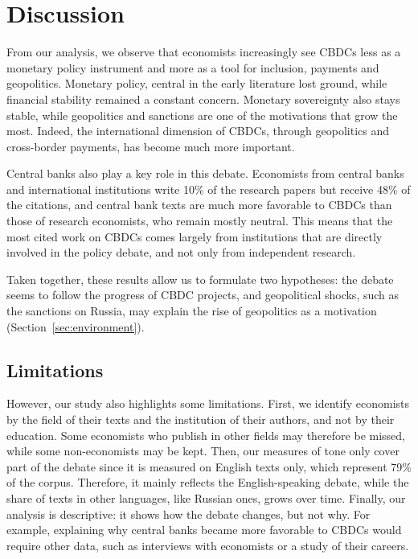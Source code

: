\documentclass[11pt,a4paper]{article}
\begin{document}
\section{Discussion}\label{sec:discussion}

From our analysis, we observe that economists increasingly see CBDCs less as a monetary policy instrument and 
more as a tool for inclusion, payments and geopolitics. Monetary policy, central in the early literature lost 
ground, while financial stability remained a constant concern. Monetary sovereignty also stays stable, while 
geopolitics and sanctions are one of the motivations that grow the most. Indeed, the international dimension of 
CBDCs, through geopolitics and cross-border payments, has become much more important.

Central banks also play a key role in this debate. Economists from central banks and international institutions 
write 10\% of the research papers but receive 48\% of the citations, and central bank texts are much more 
favorable to CBDCs than those of research economists, who remain mostly neutral. This means that the most cited 
work on CBDCs comes largely from institutions that are directly involved in the policy debate, and not only from 
independent research.

Taken together, these results allow us to formulate two hypotheses: the debate seems to follow the progress of CBDC projects, 
and geopolitical shocks, such as the sanctions on Russia, may explain the rise of geopolitics as a motivation (Section~\ref{sec:environment}).


\subsection{Limitations}

However, our study also highlights some limitations. First, we identify economists by the field of their texts 
and the institution of their authors, and not by their education. Some economists who publish in other fields 
may therefore be missed, while some non-economists may be kept. Then, our measures of tone only cover part of 
the debate since it is measured on English texts only, which represent 79\% of the corpus. Therefore, it mainly 
reflects the English-speaking debate, while the share of texts in other languages, like Russian ones, grows over 
time. Finally, our analysis is descriptive: it shows how the debate changes, but not why. For example, explaining 
why central banks became more favorable to CBDCs would require other data, such as interviews with economists or 
a study of their careers.
\end{document}

